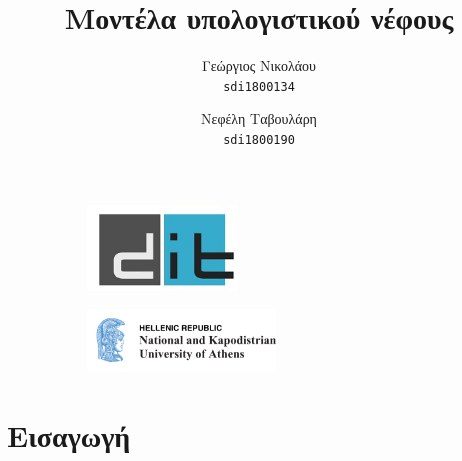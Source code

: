 \documentclass{article}
\title{%
  \selectlanguage{greek}\Huge
 Μοντέλα υπολογιστικού νέφους \\}
\begin{document}
\author{\LARGE
  Γεώργιος Νικολάου\\
   \texttt{\large sdi1800134}
  \and
  \LARGE
  Νεφέλη Ταβουλάρη\\
   \texttt{\large sdi1800190}
}
\maketitle


\begin{figure}
\centering
\begin{subfigure}
  \centering
  \includegraphics[width=40mm]{dit_logo}
  \label{fig:sub1}
\end{subfigure}%
\begin{subfigure}
  \centering
  \includegraphics[width=50mm]{NKUA_logo}
  \label{fig:sub2}
\end{subfigure}
\label{fig:test}
\end{figure}


\newpage
\tableofcontents
\newpage
\section{Εισαγωγή}
\end{document}

